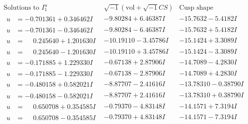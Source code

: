 \documentclass[1p]{elsarticle_modified}
\theoremstyle{definition}
\newcommand{\I}{\sqrt{-1}}
\begin{document}
$$\begin{array}{c|c|c}  
\text{Solutions to }I^u_{1}& \I (\text{vol} + \sqrt{-1}CS) & \text{Cusp shape}\\
 \hline 
\begin{aligned}
u &= -0.701361 + 0.346462 I\end{aligned}
 & -9.80284 + 6.46387 I & -15.7632 - 5.4182 I \\ \hline\begin{aligned}
u &= -0.701361 - 0.346462 I\end{aligned}
 & -9.80284 - 6.46387 I & -15.7632 + 5.4182 I \\ \hline\begin{aligned}
u &= \phantom{-}0.245640 + 1.201630 I\end{aligned}
 & -10.19110 - 3.45786 I & -15.1424 + 3.3089 I \\ \hline\begin{aligned}
u &= \phantom{-}0.245640 - 1.201630 I\end{aligned}
 & -10.19110 + 3.45786 I & -15.1424 - 3.3089 I \\ \hline\begin{aligned}
u &= -0.171885 + 1.229330 I\end{aligned}
 & -0.67138 + 2.87906 I & -14.7089 - 4.2830 I \\ \hline\begin{aligned}
u &= -0.171885 - 1.229330 I\end{aligned}
 & -0.67138 - 2.87906 I & -14.7089 + 4.2830 I \\ \hline\begin{aligned}
u &= -0.480158 + 0.582021 I\end{aligned}
 & -8.87707 - 2.41616 I & -13.78310 - 0.38790 I \\ \hline\begin{aligned}
u &= -0.480158 - 0.582021 I\end{aligned}
 & -8.87707 + 2.41616 I & -13.78310 + 0.38790 I \\ \hline\begin{aligned}
u &= \phantom{-}0.650708 + 0.354585 I\end{aligned}
 & -0.79370 - 4.83148 I & -14.1571 + 7.3194 I \\ \hline\begin{aligned}
u &= \phantom{-}0.650708 - 0.354585 I\end{aligned}
 & -0.79370 + 4.83148 I & -14.1571 - 7.3194 I \\ \hline\begin{aligned}

\end{aligned}
\end{array}$$
\end{document}
